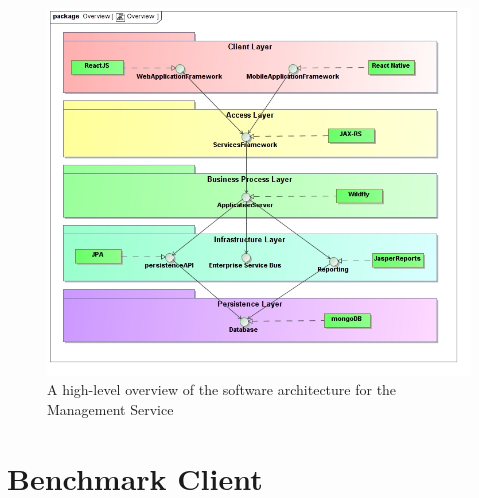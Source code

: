 \begin{figure}[H]
  \begin{center}
  \includegraphics[scale=0.4]{../Diagrams and Charts/Overview/Overview.jpg}
  \caption{A high-level overview of the software architecture for the Management Service}
  \label{fig:managementSoftwareArchitecture}
  \end{center}
\end{figure}

\section{Benchmark Client}
